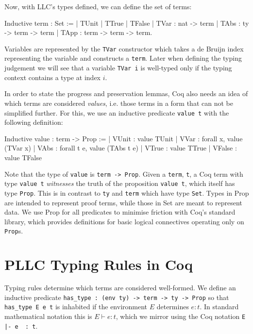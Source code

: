 \documentclass[]{unswthesis}
\newcommand{\types}{\vdash}
\let\c\texttt
\let\i\textit
\begin{document}
Now, with LLC's types defined, we can define the set of terms:

\begin{coqcode}
Inductive term : Set :=
    | TUnit | TTrue | TFalse
    | TVar : nat -> term
    | TAbs : ty -> term -> term
    | TApp : term -> term -> term.
\end{coqcode}

Variables are represented by the \c{TVar} constructor which takes a de Bruijn index representing the variable and constructs a \c{term}. Later when defining the typing judgement we will see that a variable \c{TVar i} is well-typed only if the typing context contains a type at index $i$.

In order to state the progress and preservation lemmas, Coq also needs an idea of which terms are considered \i{values}, i.e. those terms in a form that can not be simplified further. For this, we use an inductive predicate \c{value t} with the following definition:

\begin{coqcode}
Inductive value : term -> Prop :=
    | VUnit : value TUnit
    | VVar : forall x, value (TVar x)
    | VAbs : forall t e, value (TAbs t e)
    | VTrue : value TTrue
    | VFalse : value TFalse
\end{coqcode}

Note that the type of \c{value} is \c{term -> Prop}. Given a \c{term}, \c{t}, a Coq term with type \c{value t} \i{witnesses} the truth of the proposition \c{value t}, which itself has type \c{Prop}. This is in contrast to \c{ty} and \c{term} which have type \c{Set}. Types in Prop are intended to represent proof terms, while those in Set are meant to represent data. We use Prop for all predicates to minimise friction with Coq's standard library, which provides definitions for basic logical connectives operating only on \c{Prop}s.

\section{PLLC Typing Rules in Coq}
\label{app:pllc-typing-rules}

Typing rules determine which terms are considered well-formed. We define an inductive predicate \c{has_type : (env ty) -> term -> ty -> Prop} so that \c{has_type E e t} is inhabited if the environment $E$ determines $e : t$. In standard mathematical notation this is $E \types e : t$, which we mirror using the Coq notation \c{E |- e ~: t}.
\end{document}
